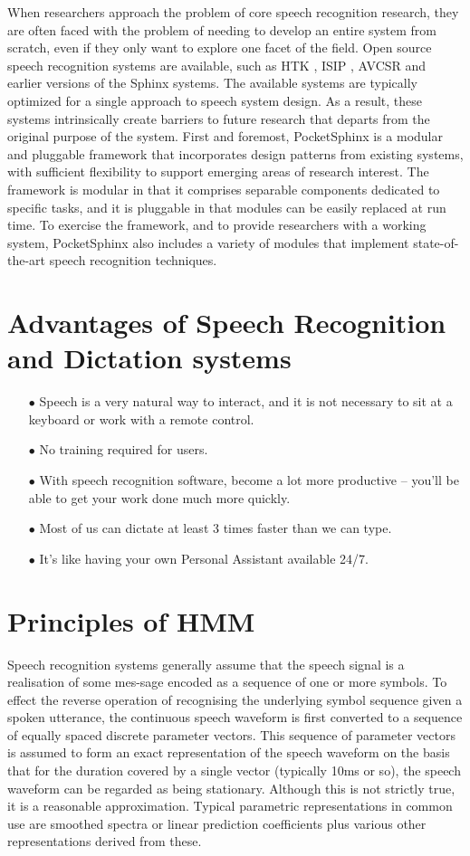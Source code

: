 \documentclass[12pt,a4paper,oldfontcommands]{memoir}
\begin{document}
When researchers approach the problem of core speech recognition research, they are often faced with the problem of needing to develop an entire system from scratch, even if they only want to explore one facet of the field. Open source speech recognition systems are available, such as HTK , ISIP , AVCSR  and earlier versions of the Sphinx systems. The available systems are typically optimized for a single approach to speech system design. As a result, these systems intrinsically create barriers to future research that departs from the original purpose of the system.  First and foremost, PocketSphinx is a modular and pluggable framework that incorporates design patterns from existing systems, with sufficient flexibility to support emerging areas of research interest. The framework is modular in that it comprises separable components dedicated to specific tasks, and it is pluggable in that modules can be easily replaced at run time. To exercise the framework, and to provide researchers with a working system, PocketSphinx also includes a variety of modules that implement state-of-the-art speech recognition techniques.


\section{Advantages of Speech Recognition and Dictation systems}

\begin{itemize}
  \item[$\bullet$] Speech is a very natural way to interact, and it is not necessary to sit at a keyboard or work with a remote control.
  \item[$\bullet$] No training required for users.
  \item[$\bullet$] With speech recognition software, become a lot more productive – you’ll be able to get your work done much more quickly.
  \item[$\bullet$] Most of us can dictate at least 3 times faster than we can type. 
  \item[$\bullet$] It’s like having your own Personal Assistant available 24/7.	
\end{itemize}

\section{Principles of HMM}
Speech recognition systems generally assume that the speech signal is a realisation of some mes-sage encoded as a sequence of one or more symbols. To effect the reverse operation of recognising the underlying symbol sequence given a spoken utterance, the continuous speech waveform is first converted to a sequence of equally spaced discrete parameter vectors. This sequence of parameter vectors is assumed to form an exact representation of the speech waveform on the basis that for the duration covered by a single vector (typically 10ms or so), the speech waveform can be regarded as being stationary. Although this is not strictly true, it is a reasonable approximation. Typical parametric representations in common use are smoothed spectra or linear prediction coefficients plus various other representations derived from these. 
\end{document}
